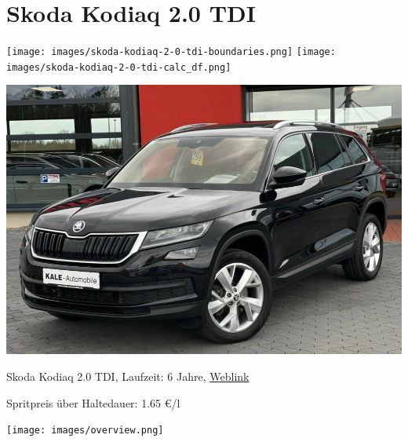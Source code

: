 \documentclass[landscape, DIV=99, 14pt]{scrartcl}
\begin{document}
\pagebreak


\twocolumn

\section*{Skoda Kodiaq 2.0 TDI}
\begin{center}
\texttt{[image: images/skoda-kodiaq-2-0-tdi-boundaries.png]}
\null
\vspace{0.5cm}
\texttt{[image: images/skoda-kodiaq-2-0-tdi-calc\_df.png]}
\end{center}

\pagebreak
\null
\vspace{2cm}
\begin{center}
\includegraphics[width=0.9\columnwidth]{cars/skoda-kodiaq-2p0-tdi.png}

Skoda Kodiaq 2.0 TDI, Laufzeit: 6 Jahre, \href{https://suchen.mobile.de/fahrzeuge/details.html?id=319879014}{Weblink}

Spritpreis \"uber Haltedauer: 1.65 \euro{}/l

\end{center}

\pagebreak



\pagebreak

\onecolumn
\null
\vfill 
\begin{center}
\texttt{[image: images/overview.png]}
\end{center}
\vfill 
\end{document}
